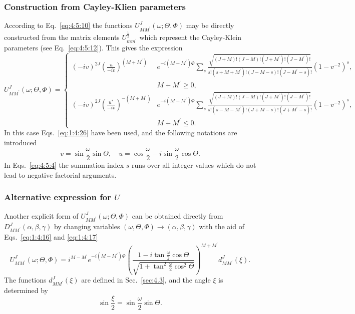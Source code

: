 \subsubsection{Construction from Cayley-Klien parameters}
 According to Eq.~\eqref{eq:4:5:10} the functions $U_{M M^{\prime}}^{J}(\omega ; \Theta, \Phi)$ may be directly constructed from the matrix elements $U_{m m^{\prime}}^{\frac{1}{2}}$ which represent the Cayley-Klein parameters (see Eq.~\eqref{eq:4:5:12}). This gives the expression
\begin{equation}
U_{M M^{\prime}}^{J}(\omega ; \Theta, \Phi)=\begin{cases}
(-i v)^{2 J}\left(\frac{u}{-i v}\right)^{\left(M+M^{\prime}\right)}& e^{-i\left(M-M^{\prime}\right) \Phi} \sum_{s} \frac{\sqrt{(J+M)!(J-M)!\left(J+M^{\prime}\right)!\left(J-M^{\prime}\right)!}}{s!\left(s+M+M^{\prime}\right)!(J-M-s)!\left(J-M^{\prime}-s\right)!}\left(1-v^{-2}\right)^{s} ,\\
& M+M^{\prime} \geq 0 ,\\
(-i v)^{2 J}\left(\frac{u^{*}}{-i v}\right)^{-\left(M+M^{\prime}\right)} & e^{-i\left(M-M^{\prime}\right) \Phi} \sum_{s} \frac{\sqrt{(J+M)!(J-M)!\left(J+M^{\prime}\right)!\left(J-M^{\prime}\right)!}}{s!\left(s-M-M^{\prime}\right)!(J+M-s)!\left(J+M^{\prime}-s\right)!}\left(1-v^{-2}\right)^{s} ,\\
& M+M^{\prime} \leq 0.
\end{cases} \label{eq:4:5:4}
\end{equation}
In this case Eqs.~\eqref{eq:1:4:26} have been used, and the following notations are introduced
\begin{equation}
v=\sin \frac{\omega}{2} \sin \Theta, \quad u=\cos \frac{\omega}{2}-i \sin \frac{\omega}{2} \cos \Theta. \label{eq:4:5:5}
\end{equation}
In Eqs.~\eqref{eq:4:5:4} the summation index $s$ runs over all integer values which do not lead to negative factorial arguments.\\
\subsubsection{Alternative expression for $U$}
Another explicit form of $U_{M M^{\prime}}^{J}(\omega ; \Theta, \Phi)$ can be obtained directly from $D_{M M^{\prime}}^{J}(\alpha, \beta, \gamma)$ by changing variables $(\omega, \Theta, \Phi) \rightarrow(\alpha, \beta, \gamma)$ with the aid of Eqs.~\eqref{eq:1:4:16} and \eqref{eq:1:4:17}
\begin{equation}
U_{M M^{\prime}}^{J}(\omega ; \Theta, \Phi)=i^{M-M^{\prime}} e^{-i\left(M-M^{\prime}\right) \Phi}\left(\frac{1-i \tan \frac{\omega}{2} \cos \Theta}{\sqrt{1+\tan ^{2} \frac{\omega}{2} \cos ^{2} \Theta}}\right)^{M+M^{\prime}} d_{M M^{\prime}}^{J}(\xi) .\label{eq:4:5:6}
\end{equation}
The functions $d_{M M^{\prime}}^{J}(\xi)$ are defined in Sec.~\ref{sec:4.3}, and the angle $\xi$ is determined by
\begin{equation}
\sin \frac{\xi}{2}=\sin \frac{\omega}{2} \sin \Theta . \label{eq:4:5:7}
\end{equation}
